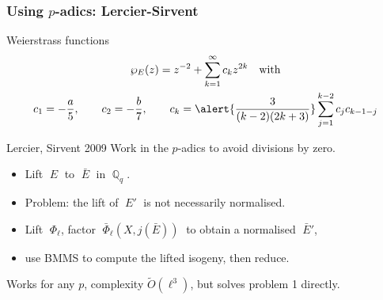 \documentclass[10pt]{beamer}
\newcommand{\Q}{\mathbb{Q}}  %
\newcommand{\0}{\mathcal{O}}  %
\newcommand{\tildO}{\tilde{O}}  %
\begin{document}
\begin{frame}
  \frametitle{Using $p$-adics: Lercier-Sirvent}

  \begin{block}{Weierstrass functions}
    \vspace{-3mm}
    \begin{gather*}
      \wp_E(z) = z^{-2} + \sum_{k=1}^{\infty}c_kz^{2k} \quad\text{with}\\
      c_1 = -\frac{a}{5}, \qquad c_2 = -\frac{b}{7}, 
      \qquad c_k = \alert{\frac{3}{(k-2)(2k+3)}}\sum_{j=1}^{k-2}c_jc_{k-1-j}
    \end{gather*}
  \end{block}

  \begin{block}{Lercier, Sirvent 2009}
    Work in the $p$-adics to avoid divisions by zero.
    \begin{itemize}
    \item Lift $\;E\;$ to $\;\bar{E}\;$ in $\;\Q_q\;$.
    \item Problem: the lift of $\;E'\;$ is not necessarily normalised.
    \item Lift $\;\Phi_\ell$, factor $\;\bar{\Phi}_\ell(X,j(\bar{E}))\;$ to
      obtain a normalised $\;\bar{E}'$,
    \item use BMMS to compute the lifted isogeny, then reduce.
    \end{itemize}
    Works for any $p$, complexity $\tildO(\ell^3)$, but solves problem
    1 directly.
  \end{block}
\end{frame}

\end{document}
